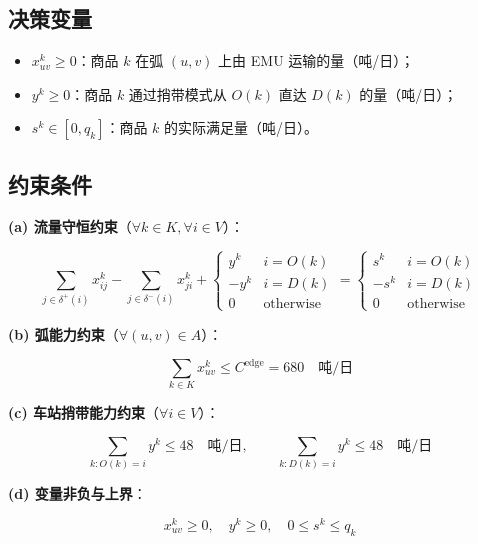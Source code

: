 \documentclass[12pt,a4paper,fontset=none]{ctexart}
\begin{document}
\subsection{决策变量}

\begin{itemize}[leftmargin=*]
    \item $x_{uv}^k \geq 0$：商品 $k$ 在弧 $(u,v)$ 上由 EMU 运输的量（吨/日）；
    \item $y^k \geq 0$：商品 $k$ 通过捎带模式从 $O(k)$ 直达 $D(k)$ 的量（吨/日）；
    \item $s^k \in [0, q_k]$：商品 $k$ 的实际满足量（吨/日）。
\end{itemize}

\subsection{约束条件}

\textbf{(a) 流量守恒约束}（$\forall k \in K, \forall i \in V$）：

\begin{equation}
\sum_{j \in \delta^+(i)} x_{ij}^k - \sum_{j \in \delta^-(i)} x_{ji}^k + 
\begin{cases}
y^k & i = O(k) \\
-y^k & i = D(k) \\
0 & \text{otherwise}
\end{cases}
=
\begin{cases}
s^k & i = O(k) \\
-s^k & i = D(k) \\
0 & \text{otherwise}
\end{cases}
\end{equation}

\textbf{(b) 弧能力约束}（$\forall (u,v) \in A$）：

\begin{equation}
\sum_{k \in K} x_{uv}^k \leq C^{\text{edge}} = 680 \quad \text{吨/日}
\end{equation}

\textbf{(c) 车站捎带能力约束}（$\forall i \in V$）：

\begin{equation}
\sum_{k: O(k) = i} y^k \leq 48 \quad \text{吨/日},\qquad 
\sum_{k: D(k) = i} y^k \leq 48 \quad \text{吨/日}
\end{equation}

\textbf{(d) 变量非负与上界}：

\begin{equation}
x_{uv}^k \geq 0,\quad y^k \geq 0,\quad 0 \leq s^k \leq q_k
\end{equation}
\end{document}
